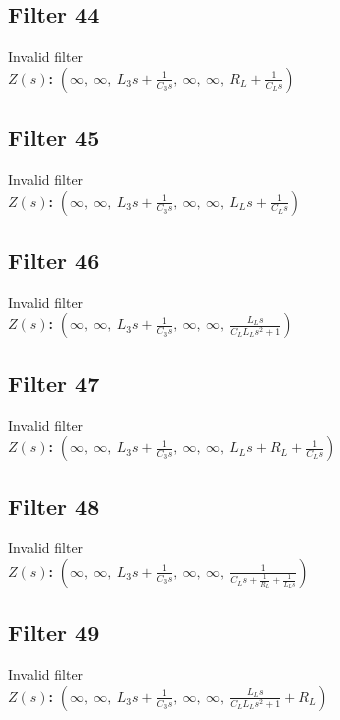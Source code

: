 \documentclass{article}
\begin{document}
\subsection*{Filter 44}
Invalid filter \\ 
\textbf{$Z(s)$:} $\left( \infty, \  \infty, \  L_{3} s + \frac{1}{C_{3} s}, \  \infty, \  \infty, \  R_{L} + \frac{1}{C_{L} s}\right)$ \\ 
\subsection*{Filter 45}
Invalid filter \\ 
\textbf{$Z(s)$:} $\left( \infty, \  \infty, \  L_{3} s + \frac{1}{C_{3} s}, \  \infty, \  \infty, \  L_{L} s + \frac{1}{C_{L} s}\right)$ \\ 
\subsection*{Filter 46}
Invalid filter \\ 
\textbf{$Z(s)$:} $\left( \infty, \  \infty, \  L_{3} s + \frac{1}{C_{3} s}, \  \infty, \  \infty, \  \frac{L_{L} s}{C_{L} L_{L} s^{2} + 1}\right)$ \\ 
\subsection*{Filter 47}
Invalid filter \\ 
\textbf{$Z(s)$:} $\left( \infty, \  \infty, \  L_{3} s + \frac{1}{C_{3} s}, \  \infty, \  \infty, \  L_{L} s + R_{L} + \frac{1}{C_{L} s}\right)$ \\ 
\subsection*{Filter 48}
Invalid filter \\ 
\textbf{$Z(s)$:} $\left( \infty, \  \infty, \  L_{3} s + \frac{1}{C_{3} s}, \  \infty, \  \infty, \  \frac{1}{C_{L} s + \frac{1}{R_{L}} + \frac{1}{L_{L} s}}\right)$ \\ 
\subsection*{Filter 49}
Invalid filter \\ 
\textbf{$Z(s)$:} $\left( \infty, \  \infty, \  L_{3} s + \frac{1}{C_{3} s}, \  \infty, \  \infty, \  \frac{L_{L} s}{C_{L} L_{L} s^{2} + 1} + R_{L}\right)$ \\ 
\end{document}
